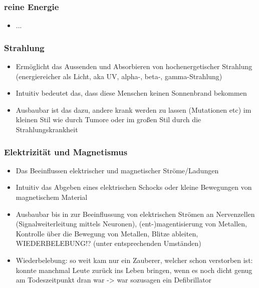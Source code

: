 \subsubsection{reine Energie}
\begin{itemize}
	\item ...
\end{itemize}

\subsubsection{Strahlung}
\begin{itemize}
	\item Ermöglicht das Aussenden und Absorbieren von hochenergetischer Strahlung (energiereicher als Licht, aka UV, alpha-, beta-, gamma-Strahlung)
	\item Intuitiv bedeutet das, dass diese Menschen keinen Sonnenbrand bekommen
	\item Ausbaubar ist das dazu, andere krank werden zu lassen (Mutationen etc) im kleinen Stil wie durch Tumore oder im großen Stil durch die Strahlungskrankheit
\end{itemize}

\subsubsection{Elektrizität und Magnetismus}
\begin{itemize}
	\item Das Beeinflussen elektrischer und magnetischer Ströme/Ladungen
	\item Intuitiv das Abgeben eines elektrischen Schocks oder kleine Bewegungen von magnetischem Material
	\item Ausbaubar bis in zur Beeinflussung von elektrischen Strömen an Nervenzellen (Signalweiterleitung mittels Neuronen), (ent-)magentisierung von Metallen, Kontrolle über die Bewegung von Metallen, Blitze ableiten, WIEDERBELEBUNG!? (unter entsprechenden Umständen)
	\item Wiederbelebung: so weit kam nur ein Zauberer, welcher schon verstorben ist: konnte manchmal Leute zurück ins Leben bringen, wenn es noch dicht genug am Todeszeitpunkt dran war -> war sozusagen ein Defibrillator
\end{itemize}

